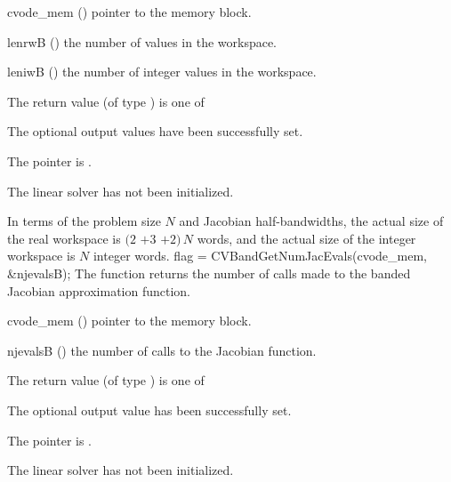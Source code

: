 {
  \begin{args}
  \item[cvode\_mem] ()
    pointer to the {\cvodes} memory block.
  \item[lenrwB] ()
    the number of  values in the {\cvband} workspace.
  \item[leniwB] ()
    the number of integer values in the {\cvband} workspace.
  \end{args}
}
{
  The return value  (of type ) is one of
  \begin{args}
  \item[\Id{CVBAND\_SUCCESS}] 
    The optional output values have been successfully set.
  \item[\Id{CVBAND\_MEM\_NULL}]
    The  pointer is .
  \item[\Id{CVBAND\_LMEM\_NULL}]
    The {\cvband} linear solver has not been initialized.
  \end{args}
}
{
  In terms of the problem size $N$ and Jacobian half-bandwidths, 
  the actual size of the real workspace is
  $(2$ $+ 3$ $+ 2)\, N$  words,
  and the actual size of the integer workspace is $N$ integer words.
}
{
  flag = CVBandGetNumJacEvals(cvode\_mem, \&njevalsB);
}
{
  The function  returns the
  number of calls made to the banded Jacobian approximation function.
}
{
  \begin{args}
  \item[cvode\_mem] ()
    pointer to the {\cvodes} memory block.
  \item[njevalsB] ()
    the number of calls to the Jacobian function.
  \end{args}
}
{
  The return value  (of type ) is one of
  \begin{args}
  \item[\Id{CVBAND\_SUCCESS}] 
    The optional output value has been successfully set.
  \item[\Id{CVBAND\_MEM\_NULL}]
    The  pointer is .
  \item[\Id{CVBAND\_LMEM\_NULL}]
    The {\cvband} linear solver has not been initialized.
  \end{args}
}
